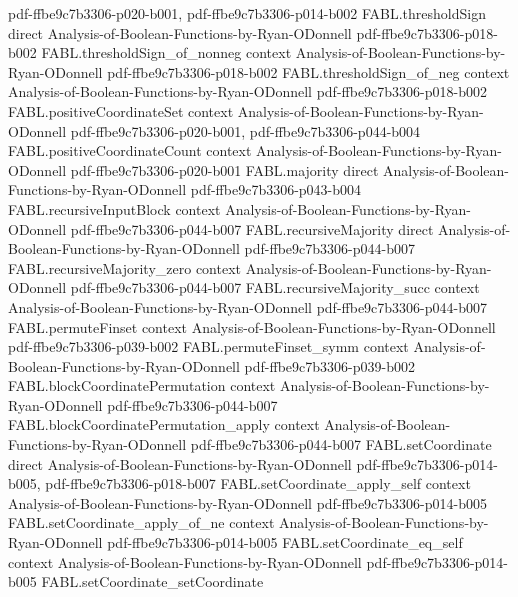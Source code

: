 \begin{theorem}
  {pdf-ffbe9c7b3306-p020-b001,
    pdf-ffbe9c7b3306-p014-b002}
\proofstep
  {FABL.thresholdSign}
  {direct}
  {Analysis-of-Boolean-Functions-by-Ryan-ODonnell}
  {pdf-ffbe9c7b3306-p018-b002}
\proofstep
  {FABL.thresholdSign_of_nonneg}
  {context}
  {Analysis-of-Boolean-Functions-by-Ryan-ODonnell}
  {pdf-ffbe9c7b3306-p018-b002}
\proofstep
  {FABL.thresholdSign_of_neg}
  {context}
  {Analysis-of-Boolean-Functions-by-Ryan-ODonnell}
  {pdf-ffbe9c7b3306-p018-b002}
\proofstep
  {FABL.positiveCoordinateSet}
  {context}
  {Analysis-of-Boolean-Functions-by-Ryan-ODonnell}
  {pdf-ffbe9c7b3306-p020-b001,
    pdf-ffbe9c7b3306-p044-b004}
\proofstep
  {FABL.positiveCoordinateCount}
  {context}
  {Analysis-of-Boolean-Functions-by-Ryan-ODonnell}
  {pdf-ffbe9c7b3306-p020-b001}
\proofstep
  {FABL.majority}
  {direct}
  {Analysis-of-Boolean-Functions-by-Ryan-ODonnell}
  {pdf-ffbe9c7b3306-p043-b004}
\proofstep
  {FABL.recursiveInputBlock}
  {context}
  {Analysis-of-Boolean-Functions-by-Ryan-ODonnell}
  {pdf-ffbe9c7b3306-p044-b007}
\proofstep
  {FABL.recursiveMajority}
  {direct}
  {Analysis-of-Boolean-Functions-by-Ryan-ODonnell}
  {pdf-ffbe9c7b3306-p044-b007}
\proofstep
  {FABL.recursiveMajority_zero}
  {context}
  {Analysis-of-Boolean-Functions-by-Ryan-ODonnell}
  {pdf-ffbe9c7b3306-p044-b007}
\proofstep
  {FABL.recursiveMajority_succ}
  {context}
  {Analysis-of-Boolean-Functions-by-Ryan-ODonnell}
  {pdf-ffbe9c7b3306-p044-b007}
\proofstep
  {FABL.permuteFinset}
  {context}
  {Analysis-of-Boolean-Functions-by-Ryan-ODonnell}
  {pdf-ffbe9c7b3306-p039-b002}
\proofstep
  {FABL.permuteFinset_symm}
  {context}
  {Analysis-of-Boolean-Functions-by-Ryan-ODonnell}
  {pdf-ffbe9c7b3306-p039-b002}
\proofstep
  {FABL.blockCoordinatePermutation}
  {context}
  {Analysis-of-Boolean-Functions-by-Ryan-ODonnell}
  {pdf-ffbe9c7b3306-p044-b007}
\proofstep
  {FABL.blockCoordinatePermutation_apply}
  {context}
  {Analysis-of-Boolean-Functions-by-Ryan-ODonnell}
  {pdf-ffbe9c7b3306-p044-b007}
\proofstep
  {FABL.setCoordinate}
  {direct}
  {Analysis-of-Boolean-Functions-by-Ryan-ODonnell}
  {pdf-ffbe9c7b3306-p014-b005,
    pdf-ffbe9c7b3306-p018-b007}
\proofstep
  {FABL.setCoordinate_apply_self}
  {context}
  {Analysis-of-Boolean-Functions-by-Ryan-ODonnell}
  {pdf-ffbe9c7b3306-p014-b005}
\proofstep
  {FABL.setCoordinate_apply_of_ne}
  {context}
  {Analysis-of-Boolean-Functions-by-Ryan-ODonnell}
  {pdf-ffbe9c7b3306-p014-b005}
\proofstep
  {FABL.setCoordinate_eq_self}
  {context}
  {Analysis-of-Boolean-Functions-by-Ryan-ODonnell}
  {pdf-ffbe9c7b3306-p014-b005}
\proofstep
  {FABL.setCoordinate_setCoordinate}

\end{theorem}
